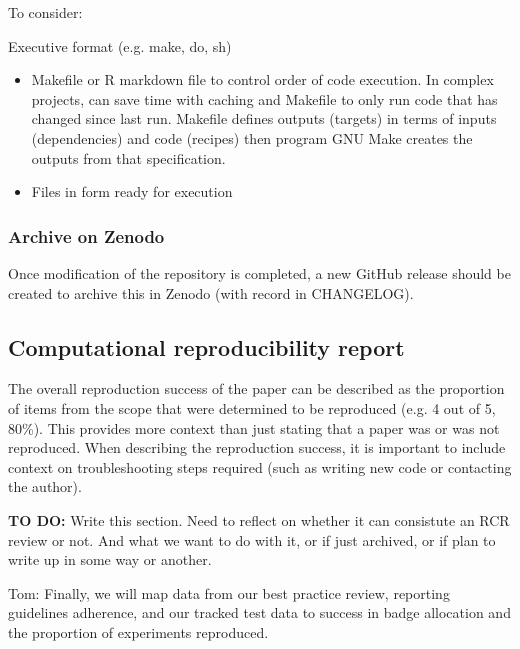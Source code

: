 To consider:

Executive format (e.g. make, do, sh)
\begin{itemize}
    \item Makefile or R markdown file to control order of code execution. In complex projects, can save time with caching and Makefile to only run code that has changed since last run. Makefile defines outputs (targets) in terms of inputs (dependencies) and code (recipes) then program GNU Make creates the outputs from that specification.\autocite{marwick_packaging_2018}
    \item Files in form ready for execution \autocite{arguillas_10_2022}
\end{itemize}

\vspace{0.5cm}
\subsubsection{Archive on Zenodo}

Once modification of the repository is completed, a new GitHub release should be created to archive this in Zenodo (with record in CHANGELOG).

\subsection{Computational reproducibility report} \label{sec:report}

The overall reproduction success of the paper can be described as the proportion of items from the scope that were determined to be reproduced (e.g. 4 out of 5, 80\%). This provides more context than just stating that a paper was or was not reproduced. When describing the reproduction success, it is important to include context on troubleshooting steps required (such as writing new code or contacting the author).


\textbf{TO DO:} Write this section. Need to reflect on whether it can consistute an RCR review or not. And what we want to do with it, or if just archived, or if plan to write up in some way or another.

Tom: Finally, we will map data from our best practice review, reporting guidelines adherence, and our tracked test data to success in badge allocation and the proportion of experiments reproduced.

